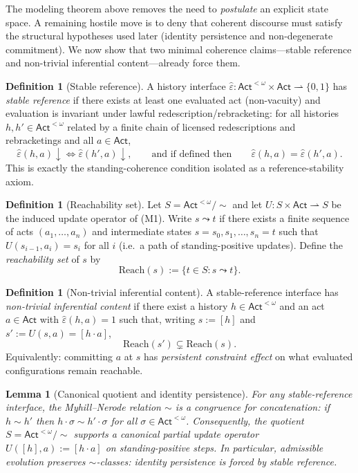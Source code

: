 \documentclass[11pt]{article}
\newtheorem{lemma}[theorem]{Lemma}
\theoremstyle{definition}
\newtheorem{definition}[theorem]{Definition}
\newcommand{\Act}{\mathsf{Act}}
\newcommand{\ppar}{\rightharpoonup} %
\begin{document}
The modeling theorem above removes the need to \emph{postulate} an explicit state space.
A remaining hostile move is to deny that coherent discourse must satisfy the structural hypotheses used later
(identity persistence and non-degenerate commitment).
We now show that two minimal coherence claims---stable reference and non-trivial inferential content---already force them.

\begin{definition}[Stable reference]
\label{def:stable-reference}
A history interface $\hat\varepsilon:\Act^{<\omega}\times\Act\ppar\{0,1\}$ has \emph{stable reference} if there exists at least one
evaluated act (non-vacuity) and evaluation is invariant under lawful redescription/rebracketing:
for all histories $h,h'\in\Act^{<\omega}$ related by a finite chain of licensed redescriptions and rebracketings and all $a\in\Act$,
\[
\hat\varepsilon(h,a)\downarrow \iff \hat\varepsilon(h',a)\downarrow,
\qquad\text{and if defined then}\qquad
\hat\varepsilon(h,a)=\hat\varepsilon(h',a).
\]
This is exactly the standing-coherence condition isolated as a reference-stability axiom.
\end{definition}

\begin{definition}[Reachability set]
Let $S=\Act^{<\omega}/\sim$ and let $U:S\times\Act\ppar S$ be the induced update operator of (M1).
Write $s\leadsto t$ if there exists a finite sequence of acts $(a_1,\dots,a_n)$ and intermediate states
$s=s_0,s_1,\dots,s_n=t$ such that $U(s_{i-1},a_i)=s_i$ for all $i$ (i.e.\ a path of standing-positive updates).
Define the \emph{reachability set} of $s$ by
\[
\mathrm{Reach}(s):=\{t\in S: s\leadsto t\}.
\]
\end{definition}

\begin{definition}[Non-trivial inferential content]
\label{def:nontrivial-inference}
A stable-reference interface has \emph{non-trivial inferential content} if there exist a history $h\in\Act^{<\omega}$ and an act $a\in\Act$
with $\hat\varepsilon(h,a)=1$ such that, writing $s:=[h]$ and $s':=U(s,a)=[h\cdot a]$,
\[
\mathrm{Reach}(s')\subsetneq \mathrm{Reach}(s).
\]
Equivalently: committing $a$ at $s$ has \emph{persistent constraint effect} on what evaluated configurations remain reachable.
\end{definition}

\begin{lemma}[Canonical quotient and identity persistence]
\label{lem:canonical-quotient}
For any stable-reference interface, the Myhill--Nerode relation $\sim$ is a congruence for concatenation:
if $h\sim h'$ then $h\cdot\sigma\sim h'\cdot\sigma$ for all $\sigma\in\Act^{<\omega}$.
Consequently, the quotient $S=\Act^{<\omega}/\sim$ supports a canonical partial update operator $U([h],a):=[h\cdot a]$ on standing-positive steps.
In particular, admissible evolution preserves $\sim$-classes: identity persistence is forced by stable reference.
\end{lemma}
\end{document}

